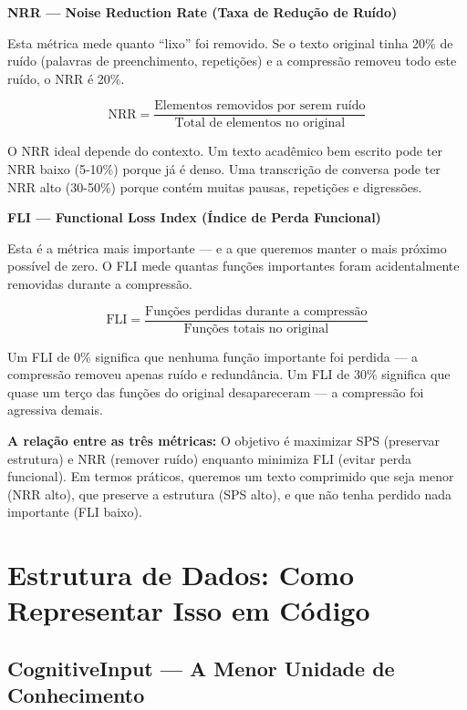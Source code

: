 \textbf{NRR — Noise Reduction Rate (Taxa de Redução de Ruído)}

Esta métrica mede quanto ``lixo'' foi removido. Se o texto original tinha 20\% de ruído (palavras de preenchimento, repetições) e a compressão removeu todo este ruído, o NRR é 20\%.

\begin{equation}
\text{NRR} = \frac{\text{Elementos removidos por serem ruído}}{\text{Total de elementos no original}}
\label{eq:nrr}
\end{equation}

O NRR ideal depende do contexto. Um texto acadêmico bem escrito pode ter NRR baixo (5-10\%) porque já é denso. Uma transcrição de conversa pode ter NRR alto (30-50\%) porque contém muitas pausas, repetições e digressões.

\textbf{FLI — Functional Loss Index (Índice de Perda Funcional)}

Esta é a métrica mais importante — e a que queremos manter o mais próximo possível de zero. O FLI mede quantas funções importantes foram acidentalmente removidas durante a compressão.

\begin{equation}
\text{FLI} = \frac{\text{Funções perdidas durante a compressão}}{\text{Funções totais no original}}
\label{eq:fli}
\end{equation}

Um FLI de 0\% significa que nenhuma função importante foi perdida — a compressão removeu apenas ruído e redundância. Um FLI de 30\% significa que quase um terço das funções do original desapareceram — a compressão foi agressiva demais.

\textbf{A relação entre as três métricas:} O objetivo é maximizar SPS (preservar estrutura) e NRR (remover ruído) enquanto minimiza FLI (evitar perda funcional). Em termos práticos, queremos um texto comprimido que seja menor (NRR alto), que preserve a estrutura (SPS alto), e que não tenha perdido nada importante (FLI baixo).

\section{Estrutura de Dados: Como Representar Isso em Código}

\subsection{CognitiveInput — A Menor Unidade de Conhecimento}

